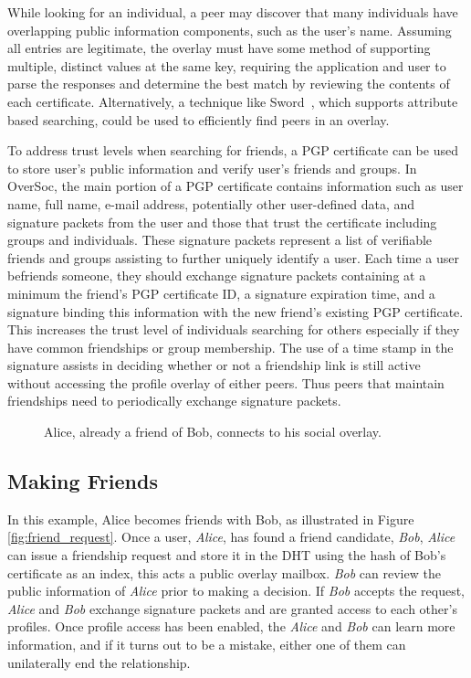 While looking for an individual, a peer may discover that many individuals have
overlapping public information components, such as the user's name.  Assuming
all entries are legitimate, the overlay must have some method of supporting
multiple, distinct values at the same key, requiring the application and user
to parse the responses and determine the best match by reviewing the contents
of each certificate.  Alternatively, a technique like Sword~\cite{sword}, which
supports attribute based searching, could be used to efficiently find peers in
an overlay.

To address trust levels when searching for friends, a PGP certificate can be
used to store user's public information and verify user's friends and groups.
In OverSoc, the main portion of a PGP certificate contains information such as
user name, full name, e-mail address, potentially other user-defined data, and
signature packets from the user and those that trust the certificate including
groups and individuals.  These signature packets represent a list of verifiable
friends and groups assisting to further uniquely identify a user.  Each time a
user befriends someone, they should exchange signature packets containing at a
minimum the friend's PGP certificate ID, a signature expiration time, and a
signature binding this information with the new friend's existing PGP
certificate.  This increases the trust level of individuals searching for
others especially if they have common friendships or group membership.  The use
of a time stamp in the signature assists in deciding whether or not a
friendship link is still active without accessing the profile overlay of either
peers.  Thus peers that maintain friendships need to periodically exchange
signature packets.

\begin{figure}
\centering
{}
\caption{Alice, already a friend of Bob, connects to his social overlay.}
\label{fig:friendship_join}
\end{figure}

\subsection{Making Friends}

In this example, Alice becomes friends with Bob, as illustrated in Figure
\ref{fig:friend_request}.  Once a user, \textit{Alice}, has found a friend
candidate, \textit{Bob}, \textit{Alice} can issue a friendship request and
store it in the DHT using the hash of Bob's certificate as an index, this acts
a public overlay mailbox.  \textit{Bob} can review the public information of
\textit{Alice} prior to making a decision.  If \textit{Bob} accepts the
request, \textit{Alice} and \textit{Bob} exchange signature packets and are
granted access to each other's profiles.  Once profile access has been enabled,
the \textit{Alice} and \textit{Bob} can learn more information, and if it turns
out to be a mistake, either one of them can unilaterally end the relationship.

